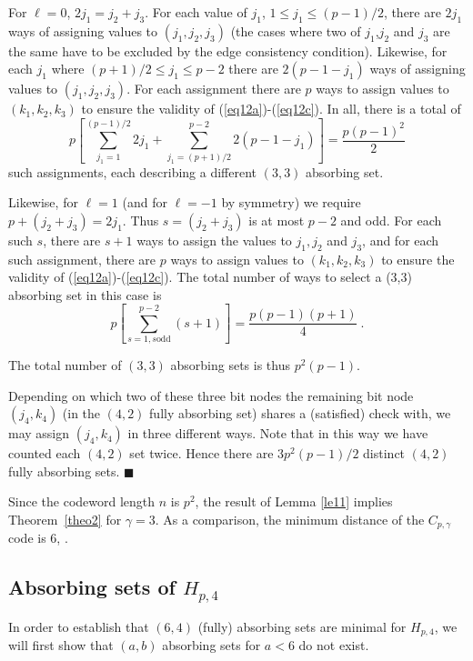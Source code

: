 For $\ell=0$, $2j_1=j_2+j_3$. For each value of $j_1$, $1 \leq j_1
\leq (p-1)/2$, there are $2j_1$ ways of assigning values to
$(j_1,j_2,j_3)$ (the cases where two of $j_1$,$j_2$ and $j_3$ are
the same have to be excluded by the edge consistency condition).
Likewise, for each $j_1$ where $(p+1)/2 \leq j_1 \leq p-2$ there
are $2(p-1-j_1)$ ways of assigning values to $(j_1,j_2,j_3)$. For
each assignment there are $p$ ways to assign values to
$(k_1,k_2,k_3)$ to ensure the validity of
(\ref{eq12a})-(\ref{eq12c}). In all, there is a total of
\[p\left[\sum_{j_1=1}^{(p-1)/2} 2j_1 + \sum_{j_1=(p+1)/2}^{p-2}
2(p-1-j_1)\right] = \frac{p(p-1)^2}{2}\] such assignments, each
describing a different $(3,3)$ absorbing set.

Likewise, for $\ell=1$ (and for $\ell=-1$ by symmetry) we require
$p+(j_2+j_3)=2j_1$. Thus $s=(j_2+j_3)$ is at most $p-2$ and odd.
For each such $s$, there are $s+1$ ways to assign the values to
$j_1,j_2$ and $j_3$, and for each such assignment, there are $p$
ways to assign values to $(k_1,k_2,k_3)$ to ensure the validity of
(\ref{eq12a})-(\ref{eq12c}). The total number of ways to select a
(3,3) absorbing set in this case is
\[
p\left[\sum_{s=1, s \text{
odd}}^{p-2}(s+1)\right]=\frac{p(p-1)(p+1)}{4}~.
\]

The total number of $(3,3)$ absorbing sets is thus $p^2(p-1)$.

Depending on which two of these three bit nodes the remaining bit
node $(j_4,k_4)$ (in the $(4,2)$ fully absorbing set) shares a
(satisfied) check with, we may assign $(j_4,k_4)$ in three
different ways. Note that in this way we have counted each $(4,2)$
set twice. Hence there are $3p^2(p-1)/2$ distinct $(4,2)$ fully
absorbing sets. \hfill$\blacksquare$


Since the codeword length $n$ is $p^2$, the result of Lemma
\ref{le11} implies Theorem~\ref{theo2} for $\gamma=3$. As a
comparison, the minimum distance of the $C_{p,\gamma}$ code is
$6$, \cite{helles}.
\subsection{Absorbing sets of
$H_{p,4}$}\label{theo14}


In order to establish that $(6,4)$ (fully) absorbing sets are
minimal for $H_{p,4}$, we will first show that $(a,b)$ absorbing
sets for $a < 6$ do not exist.



